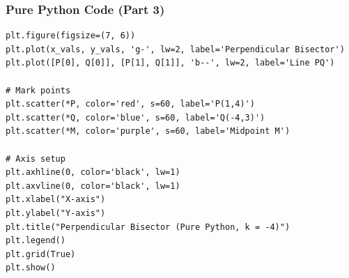 \documentclass{beamer}
\begin{document}
\begin{frame}[fragile]
\frametitle{Pure Python Code (Part 3)}
\begin{lstlisting}
plt.figure(figsize=(7, 6))
plt.plot(x_vals, y_vals, 'g-', lw=2, label='Perpendicular Bisector')
plt.plot([P[0], Q[0]], [P[1], Q[1]], 'b--', lw=2, label='Line PQ')

# Mark points
plt.scatter(*P, color='red', s=60, label='P(1,4)')
plt.scatter(*Q, color='blue', s=60, label='Q(-4,3)')
plt.scatter(*M, color='purple', s=60, label='Midpoint M')

# Axis setup
plt.axhline(0, color='black', lw=1)
plt.axvline(0, color='black', lw=1)
plt.xlabel("X-axis")
plt.ylabel("Y-axis")
plt.title("Perpendicular Bisector (Pure Python, k = -4)")
plt.legend()
plt.grid(True)
plt.show()
\end{lstlisting}
\end{frame}

\end{document}
